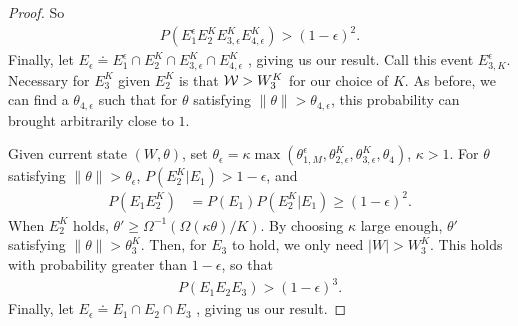 \begin{proof}
{So \begin{align*}
P(E_1^\epsilon E_2^K E_{3,\epsilon}^K E_{4,\epsilon}^K) > (1- \epsilon)^2.
\end{align*} 
Finally, let $E_\epsilon \doteq E_1^\epsilon \cap E_2^K \cap E_{3,\epsilon}^K \cap E_{4,\epsilon}^K$ , giving us our result.
}
Call this event $E_{3,K}^\epsilon$. Necessary for $E_3^{K}$ given $E_2^{K}$ is that
${\mathcal W} > W^K_3$ for our choice of $K$. As before, we can find a $\theta_{4,\epsilon}$
such that for $\theta$ satisfying $ \| \theta \|  > \theta_{4,\epsilon}$, this probability can brought arbitrarily close to $1$.



Given current state $(W, \theta)$, set $\theta_\epsilon =
\kappa \max(\theta_{1, M}^\epsilon,\theta^K_{2, \epsilon},\theta^K_{3, \epsilon}, \theta_4)$, $\kappa > 1$.
For $\theta$ satisfying $ \| \theta \| > \theta_\epsilon$, $P(E^K_2 | E_1)>1-\epsilon$, and
\begin{align*}
P(E_1E^K_2) %
& = P(E_1) P(E^K_2|E_1) \ge (1 - \epsilon)^2.
\end{align*}
When $E^K_2$ holds, $\theta' \ge \Omega^{-1}(\Omega(\kappa\theta)/K)$.
By choosing $\kappa$ large enough, $\theta'$ satisfying $ \| \theta \| > \theta^K_3$. Then, for
$E_3$ to hold, we only need $|W| > W^K_3$. This holds with probability
greater than $1-\epsilon$, so that
\begin{align*}
  P(E_1E_2E_3) > (1- \epsilon)^3.
\end{align*}
Finally, let $E_\epsilon \doteq E_1\cap E_2 \cap E_3$ , giving us our result.


\end{proof}
